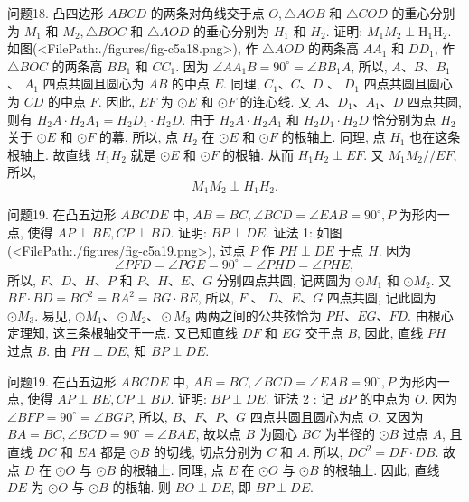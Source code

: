 问题18. 凸四边形 $A B C D$ 的两条对角线交于点 $O, \triangle A O B$ 和 $\triangle C O D$ 的重心分别为 $M_1$ 和 $M_2, \triangle B O C$ 和 $\triangle A O D$ 的垂心分别为 $H_1$ 和 $H_2$. 证明: $M_1 M_2 \perp \mathrm{H}_1 \mathrm{H}_2$.
如图(<FilePath:./figures/fig-c5a18.png>), 作 $\triangle A O D$ 的两条高 $A A_1$ 和 $D D_1$, 作 $\triangle B O C$ 的两条高 $B B_1$ 和
$C C_1$. 因为 $\angle A A_1 B=90^{\circ}=\angle B B_1 A$, 所以, $A 、 B 、 B_1$ 、 $A_1$ 四点共圆且圆心为 $A B$ 的中点 $E$. 同理, $C_1 、 C 、 D$ 、 $D_1$ 四点共圆且圆心为 $C D$ 的中点 $F$. 因此, $E F$ 为 $\odot E$ 和 $\odot F$ 的连心线.
又 $A 、 D_1 、 A_1 、 D$ 四点共圆, 则有 $H_2 A \cdot H_2 A_1=H_2 D_1 \cdot H_2 D$. 由于 $H_2 A \cdot H_2 A_1$ 和 $H_2 D_1 \cdot H_2 D$ 恰分别为点 $H_2$ 关于 $\odot E$ 和 $\odot F$ 的幕, 所以, 点 $H_2$ 在 $\odot E$ 和 $\odot F$ 的根轴上.
同理, 点 $H_1$ 也在这条根轴上.
故直线 $H_1 H_2$ 就是 $\odot E$ 和 $\odot F$ 的根轴.
从而 $H_1 H_2 \perp E F$. 又 $M_1 M_2 / / E F$, 所以,
$$
M_1 M_2 \perp H_1 H_2 .
$$



问题19. 在凸五边形 $A B C D E$ 中, $A B=B C, \angle B C D=\angle E A B=90^{\circ}, P$ 为形内一点, 使得 $A P \perp B E, C P \perp B D$. 证明: $B P \perp D E$.
证法 1: 如图(<FilePath:./figures/fig-c5a19.png>), 过点 $P$ 作 $P H \perp D E$ 于点 $H$. 因为
$$
\angle P F D=\angle P G E=90^{\circ}=\angle P H D=\angle P H E,
$$
所以, $F 、 D 、 H 、 P$ 和 $P 、 H 、 E 、 G$ 分别四点共圆, 记两圆为 $\odot M_1$ 和 $\odot M_2$. 又 $B F \cdot B D=B C^2=B A^2=B G \cdot B E$, 所以, $F$ 、 $D 、 E 、 G$ 四点共圆, 记此圆为 $\odot M_3$.
易见, $\odot M_1 、 \odot M_2 、 \odot M_3$ 两两之间的公共弦恰为 $P H 、 E G 、 F D$. 由根心定理知, 这三条根轴交于一点.
又已知直线 $D F$ 和 $E G$ 交于点 $B$, 因此, 直线 $P H$ 过点 $B$.
由 $P H \perp D E$, 知 $B P \perp D E$.



问题19. 在凸五边形 $A B C D E$ 中, $A B=B C, \angle B C D=\angle E A B=90^{\circ}, P$ 为形内一点, 使得 $A P \perp B E, C P \perp B D$. 证明: $B P \perp D E$.
证法 2 : 记 $B P$ 的中点为 $O$.
因为 $\angle B F P=90^{\circ}=\angle B G P$, 所以, $B 、 F 、 P 、 G$ 四点共圆且圆心为点 $O$.
又因为 $B A=B C, \angle B C D=90^{\circ}=\angle B A E$, 故以点 $B$ 为圆心 $B C$ 为半径的 $\odot B$ 过点 $A$, 且直线 $D C$ 和 $E A$ 都是 $\odot B$ 的切线, 切点分别为 $C$ 和 $A$.
所以, $D C^2=D F \cdot D B$.
故点 $D$ 在 $\odot O$ 与 $\odot B$ 的根轴上.
同理, 点 $E$ 在 $\odot O$ 与 $\odot B$ 的根轴上.
因此, 直线 $D E$ 为 $\odot O$ 与 $\odot B$ 的根轴.
则 $B O \perp D E$, 即 $B P \perp D E$.



